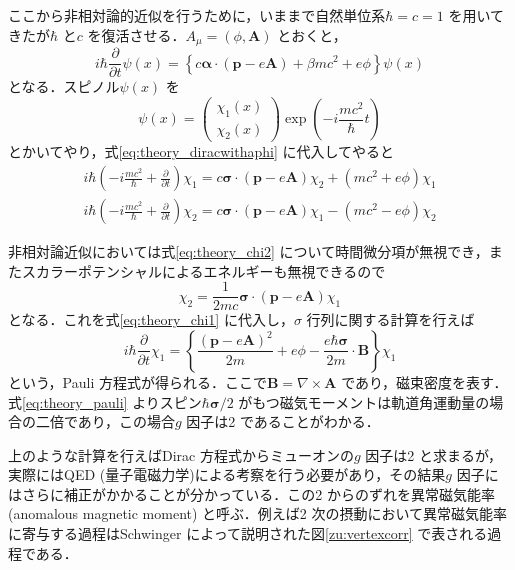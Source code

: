 	ここから非相対論的近似を行うために，いままで自然単位系$\hbar = c = 1$ を用いてきたが$\hbar$ と$c$ を復活させる．$A_{\mu} = (\phi, \bm{A})$ とおくと，
	\begin{equation}
	i\hbar\frac{\partial}{\partial t}\psi(x) = \left\{c\bm{\alpha}\cdot (\bm{p} - e\bm{A}) + \beta m c^{2} + e \phi\right\}\psi(x)
	\label{eq:theory_diracwithaphi}
	\end{equation}
	となる．スピノル$\psi(x)$ を
	\begin{equation}
	\psi(x) = \begin{pmatrix}
			\chi_{1} (x)\\
			\chi_{2} (x)
			\end{pmatrix} \exp \left( - i \frac{mc^{2}}{\hbar} t\right)
	\end{equation}
	とかいてやり，式\eqref{eq:theory_diracwithaphi} に代入してやると
	\begin{align}
	i\hbar\left( -i\frac{mc^{2}}{\hbar} + \frac{\partial}{\partial t}\right) \chi_{1} = c\bm{\sigma}\cdot(\bm{p} - e \bm{A})\chi_{2} + (mc^{2} + e\phi)\chi_{1} \label{eq:theory_chi1}\\ 
	i\hbar\left( -i\frac{mc^{2}}{\hbar} + \frac{\partial}{\partial t}\right) \chi_{2} = c\bm{\sigma}\cdot(\bm{p} - e \bm{A})\chi_{1} - (mc^{2} - e\phi)\chi_{2} \label{eq:theory_chi2}
	\end{align}

	非相対論近似においては式\eqref{eq:theory_chi2} について時間微分項が無視でき，またスカラーポテンシャルによるエネルギーも無視できるので
	\begin{equation}
	\chi_{2} = \frac{1}{2mc}\bm{\sigma}\cdot(\bm{p} - e\bm{A})\chi_{1}
	\end{equation}
	となる．これを式\eqref{eq:theory_chi1} に代入し，$\sigma$ 行列に関する計算を行えば
	\begin{equation}
	i\hbar\frac{\partial}{\partial t}\chi_{1} = \left\{\frac{(\bm{p} - e\bm{A})^{2}}{2m} + e\phi - \frac{e\hbar\bm{\sigma}}{2m}\cdot\bm{B}\right\}\chi_{1}
	\label{eq:theory_pauli}
	\end{equation}
	という，Pauli 方程式が得られる．ここで$\bm{B} = \nabla \times \bm{A}$ であり，磁束密度を表す．式\eqref{eq:theory_pauli} よりスピン$\hbar\bm{\sigma}/2$ がもつ磁気モーメントは軌道角運動量の場合の二倍であり，この場合$g$ 因子は2 であることがわかる．

	上のような計算を行えばDirac 方程式からミューオンの$g$ 因子は2 と求まるが，実際にはQED (量子電磁力学)による考察を行う必要があり，その結果$g$ 因子にはさらに補正がかかることが分かっている．この2 からのずれを異常磁気能率 (anomalous magnetic moment) と呼ぶ．例えば2 次の摂動において異常磁気能率に寄与する過程はSchwinger によって説明された図\ref{zu:vertexcorr} で表される過程である．


